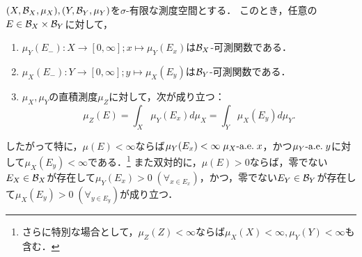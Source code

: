 \documentclass[uplatex, dvipdfmx]{jsreport}
\begin{document}
\begin{theorem}\label{thm-Fubini-I}
    $(X,\mathcal{B}_X,\mu_X),(Y,\mathcal{B}_Y,\mu_Y)$を$\sigma$-有限な測度空間とする．
    このとき，任意の$E\in\mathcal{B}_X\times\mathcal{B}_Y$に対して，
    \begin{enumerate}
        \item $\mu_Y(E_-):X\to[0,\infty];x\mapsto\mu_Y(E_x)$は$\mathcal{B}_X$-可測関数である．
        \item $\mu_X(E_-):Y\to[0,\infty];y\mapsto\mu_X(E_y)$は$\mathcal{B}_Y$-可測関数である．
        \item $\mu_X,\mu_Y$の直積測度$\mu_Z$に対して，次が成り立つ：
        \[\mu_Z(E)=\int_X\mu_Y(E_x)d\mu_X=\int_Y\mu_X(E_y)d\mu_Y.\]
    \end{enumerate}
    したがって特に，$\mu(E)<\infty$ならば$\mu_Y(E_x)<\infty\;\mu_X\textrm{-a.e.}\; x$，かつ$\mu_Y\textrm{-a.e.}\; y$に対して$\mu_X(E_y)<\infty$である．\footnote{さらに特別な場合として，$\mu_Z(Z)<\infty$ならば$\mu_X(X)<\infty,\mu_Y(Y)<\infty$も含む．}
    また双対的に，$\mu(E)>0$ならば，零でない$E_X\in\mathcal{B}_X$が存在して$\mu_Y(E_x)>0\;(\forall_{x\in E_x})$，かつ，零でない$E_Y\in\mathcal{B}_Y$が存在して$\mu_X(E_y)>0\;(\forall_{y\in E_y})$が成り立つ．
\end{theorem}
\end{document}
